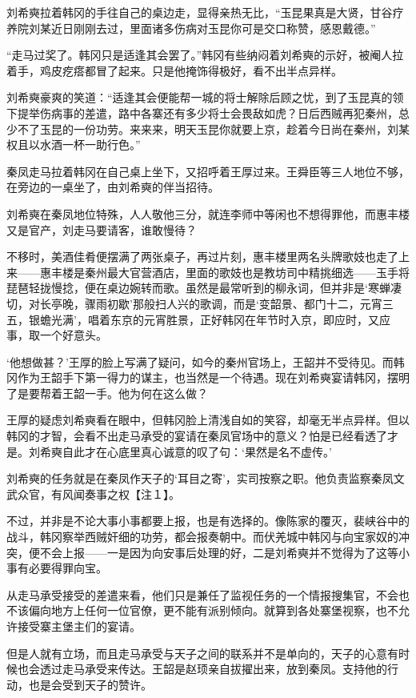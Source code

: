 刘希奭拉着韩冈的手往自己的桌边走，显得亲热无比，“玉昆果真是大贤，甘谷疗养院刘某近日刚刚去过，里面诸多伤病对玉昆你可是交口称赞，感恩戴德。”

“走马过奖了。韩冈只是适逢其会罢了。”韩冈有些纳闷着刘希奭的示好，被阉人拉着手，鸡皮疙瘩都冒了起来。只是他掩饰得极好，看不出半点异样。

刘希奭豪爽的笑道：“适逢其会便能帮一城的将士解除后顾之忧，到了玉昆真的领下提举伤病事的差遣，路中各寨还有多少将士会畏敌如虎？日后西贼再犯秦州，总少不了玉昆的一份功劳。来来来，明天玉昆你就要上京，趁着今日尚在秦州，刘某权且以水酒一杯一助行色。”

秦凤走马拉着韩冈在自己桌上坐下，又招呼着王厚过来。王舜臣等三人地位不够，在旁边的一桌坐了，由刘希奭的伴当招待。

刘希奭在秦凤地位特殊，人人敬他三分，就连李师中等闲也不想得罪他，而惠丰楼又是官产，刘走马要请客，谁敢慢待？

不移时，美酒佳肴便摆满了两张桌子，再过片刻，惠丰楼里两名头牌歌妓也走了上来——惠丰楼是秦州最大官营酒店，里面的歌妓也是教坊司中精挑细选——玉手将琵琶轻拢慢捻，便在桌边婉转而歌。虽然是最常听到的柳永词，但并非是‘寒蝉凄切，对长亭晚，骤雨初歇’那般扫人兴的歌调，而是‘变韶景、都门十二，元宵三五，银蟾光满’，唱着东京的元宵胜景，正好韩冈在年节时入京，即应时，又应事，取一个好意头。

‘他想做甚？’王厚的脸上写满了疑问，如今的秦州官场上，王韶并不受待见。而韩冈作为王韶手下第一得力的谋主，也当然是一个待遇。现在刘希奭宴请韩冈，摆明了是要帮着王韶一手。他为何在这么做？

王厚的疑虑刘希奭看在眼中，但韩冈脸上清浅自如的笑容，却毫无半点异样。但以韩冈的才智，会看不出走马承受的宴请在秦凤官场中的意义？怕是已经看透了才是。刘希奭自此才在心底里真心诚意的叹了句：‘果然是名不虚传。’

刘希奭的任务就是在秦凤作天子的‘耳目之寄’，实司按察之职。他负责监察秦凤文武众官，有风闻奏事之权【注１】。

不过，并非是不论大事小事都要上报，也是有选择的。像陈家的覆灭，裴峡谷中的战斗，韩冈察举西贼奸细的功劳，都会报奏朝中。而伏羌城中韩冈与向宝家奴的冲突，便不会上报——一是因为向安事后处理的好，二是刘希奭并不觉得为了这等小事有必要得罪向宝。

从走马承受接受的差遣来看，他们只是兼任了监视任务的一个情报搜集官，不会也不该偏向地方上任何一位官僚，更不能有派别倾向。就算到各处寨堡视察，也不允许接受寨主堡主们的宴请。

但是人就有立场，而且走马承受与天子之间的联系并不是单向的，天子的心意有时候也会透过走马承受来传达。王韶是赵顼亲自拔擢出来，放到秦凤。支持他的行动，也是会受到天子的赞许。

